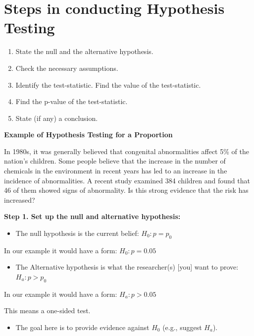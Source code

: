\section*{Steps in conducting Hypothesis Testing}

\begin{enumerate}
  \item State the null and the alternative hypothesis.
  \item Check the necessary assumptions.
  \item Identify the test-statistic. Find the value of the test-statistic.
  \item Find the p-value of the test-statistic.
  \item State (if any) a conclusion.
\end{enumerate}

\begin{example}
\textbf{Example of Hypothesis Testing for a Proportion}

In 1980s, it was generally believed that congenital abnormalities affect 5\% of the nation’s children. Some people believe that the increase in the number of chemicals in the environment in recent years has led to an increase in the incidence of abnormalities. A recent study examined 384 children and found that 46 of them showed signs of abnormality. Is this strong evidence that the risk has increased?

\vspace{1em}
\textbf{Step 1. Set up the null and alternative hypothesis:}

\begin{itemize}
  \item The null hypothesis is the current belief: $H_0 : p = p_0$
\end{itemize}

In our example it would have a form: $H_0 : p = 0.05$

\begin{itemize}
  \item The Alternative hypothesis is what the researcher(s) [you] want to prove: $H_a : p > p_0$
\end{itemize}

In our example it would have a form: $H_a : p > 0.05$

This means a one-sided test.

\begin{itemize}
  \item The goal here is to provide evidence against $H_0$ (e.g., suggest $H_a$).
\end{itemize}


\end{example}
